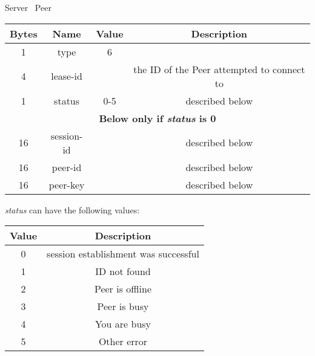 \documentclass{article}
\begin{document}
    \begin{center}
        Server \textrightarrow\ Peer\\
        \begin{tabular}{|c|c|c|c|}
            \hline
            \textbf{Bytes} & \textbf{Name} & \textbf{Value} & \textbf{Description}                       \\
            \hline
            1              & type          & 6              &                                            \\
            \hline
            4              & lease-id      &                & the ID of the Peer attempted to connect to \\
            \hline
            1              & status        & 0-5            & described below                            \\
            \hline
            \multicolumn{4}{|c|}{\textbf{Below only if \emph{status} is 0} } \\
            \hline
            16             & session-id    &                & described below                            \\
            \hline
            16             & peer-id       &                & described below                            \\
            \hline
            16             & peer-key      &                & described below                            \\
            \hline
        \end{tabular}
    \end{center}

    \emph{status} can have the following values:

    \begin{center}
        \begin{tabular}{|c|c|}
            \hline
            \textbf{Value} & \textbf{Description}                 \\
            \hline
            0              & session establishment was successful \\
            \hline
            1              & ID not found                         \\
            \hline
            2              & Peer is offline                      \\
            \hline
            3              & Peer is busy                         \\
            \hline
            4              & You are busy                         \\
            \hline
            5              & Other error                          \\
            \hline
        \end{tabular}
    \end{center}
\end{document}

